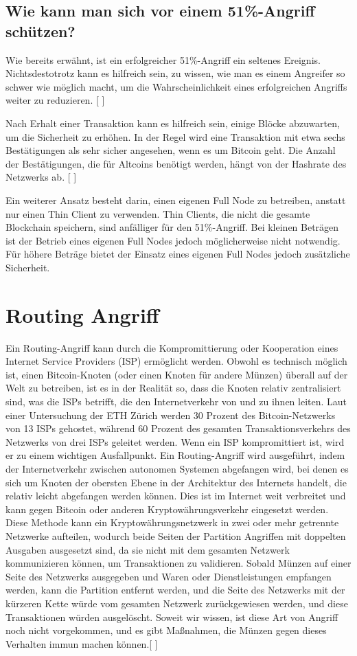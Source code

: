 \documentclass[ngerman]{scrreprt}
\begin{document}
\subsection{Wie kann man sich vor einem 51\%-Angriff schützen?}
Wie bereits erwähnt, ist ein erfolgreicher 51\%-Angriff ein seltenes Ereignis. Nichtsdestotrotz kann es hilfreich sein, zu wissen, wie man es einem Angreifer so schwer wie möglich macht, um die Wahrscheinlichkeit eines erfolgreichen Angriffs weiter zu reduzieren. [ \cite{51attack} ]

Nach Erhalt einer Transaktion kann es hilfreich sein, einige Blöcke abzuwarten, um die Sicherheit zu erhöhen. In der Regel wird eine Transaktion mit etwa sechs Bestätigungen als sehr sicher angesehen, wenn es um Bitcoin geht. Die Anzahl der Bestätigungen, die für Altcoins benötigt werden, hängt von der Hashrate des Netzwerks ab. [ \cite{51attack} ]

Ein weiterer Ansatz besteht darin, einen eigenen Full Node zu betreiben, anstatt nur einen Thin Client zu verwenden. Thin Clients, die nicht die gesamte Blockchain speichern, sind anfälliger für den 51\%-Angriff. Bei kleinen Beträgen ist der Betrieb eines eigenen Full Nodes jedoch möglicherweise nicht notwendig. Für höhere Beträge bietet der Einsatz eines eigenen Full Nodes jedoch zusätzliche Sicherheit.

\section{Routing Angriff}
Ein Routing-Angriff kann durch die Kompromittierung oder Kooperation eines Internet Service Providers (ISP) ermöglicht werden. Obwohl es technisch möglich ist, einen Bitcoin-Knoten (oder einen Knoten für andere Münzen) überall auf der Welt zu betreiben, ist es in der Realität so, dass die Knoten relativ zentralisiert sind, was die ISPs betrifft, die den Internetverkehr von und zu ihnen leiten. Laut einer Untersuchung der ETH Zürich werden 30 Prozent des Bitcoin-Netzwerks von 13 ISPs gehostet, während 60 Prozent des gesamten Transaktionsverkehrs des Netzwerks von drei ISPs geleitet werden. Wenn ein ISP kompromittiert ist, wird er zu einem wichtigen Ausfallpunkt. Ein Routing-Angriff wird ausgeführt, indem der Internetverkehr zwischen autonomen Systemen abgefangen wird, bei denen es sich um Knoten der obersten Ebene in der Architektur des Internets handelt, die relativ leicht abgefangen werden können. Dies ist im Internet weit verbreitet und kann gegen Bitcoin oder anderen Kryptowährungsverkehr eingesetzt werden. Diese Methode kann ein Kryptowährungsnetzwerk in zwei oder mehr getrennte Netzwerke aufteilen, wodurch beide Seiten der Partition Angriffen mit doppelten Ausgaben ausgesetzt sind, da sie nicht mit dem gesamten Netzwerk kommunizieren können, um Transaktionen zu validieren. Sobald Münzen auf einer Seite des Netzwerks ausgegeben und Waren oder Dienstleistungen empfangen werden, kann die Partition entfernt werden, und die Seite des Netzwerks mit der kürzeren Kette würde vom gesamten Netzwerk zurückgewiesen werden, und diese Transaktionen würden ausgelöscht. Soweit wir wissen, ist diese Art von Angriff noch nicht vorgekommen, und es gibt Maßnahmen, die Münzen gegen dieses Verhalten immun machen können.[ \cite{allatacks} ]
\end{document}
